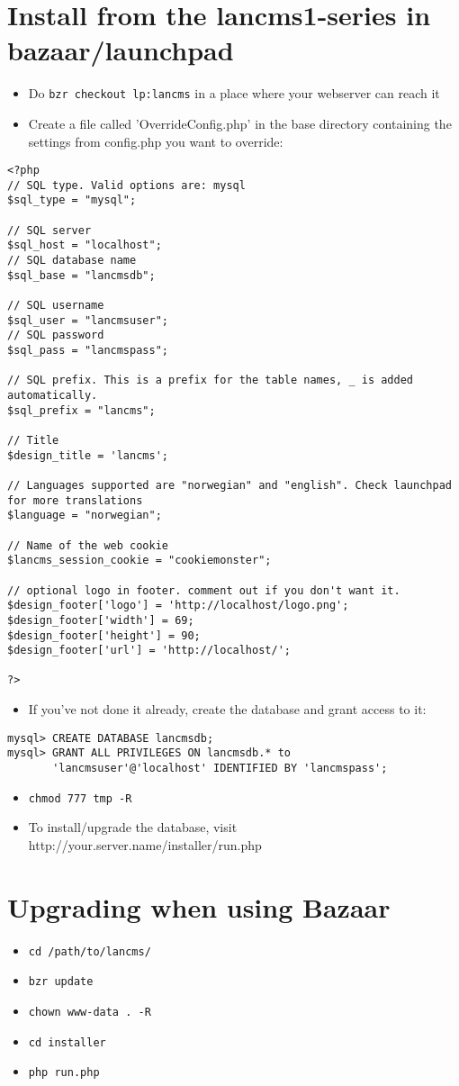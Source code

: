 \section{Install from the lancms1-series in bazaar/launchpad}
\begin{itemize}
\item Do \lstinline!bzr checkout lp:lancms! in a place where your webserver can reach it
\item Create a file called 'OverrideConfig.php' in the base directory containing the settings from config.php you want to override:
\end{itemize}
\begin{lstlisting}
<?php
// SQL type. Valid options are: mysql
$sql_type = "mysql";

// SQL server
$sql_host = "localhost";
// SQL database name
$sql_base = "lancmsdb";

// SQL username
$sql_user = "lancmsuser";
// SQL password
$sql_pass = "lancmspass";

// SQL prefix. This is a prefix for the table names, _ is added automatically.
$sql_prefix = "lancms";

// Title
$design_title = 'lancms';

// Languages supported are "norwegian" and "english". Check launchpad for more translations
$language = "norwegian";

// Name of the web cookie
$lancms_session_cookie = "cookiemonster";

// optional logo in footer. comment out if you don't want it.
$design_footer['logo'] = 'http://localhost/logo.png';
$design_footer['width'] = 69;
$design_footer['height'] = 90;
$design_footer['url'] = 'http://localhost/';

?>
\end{lstlisting}
\begin{itemize}
\item If you've not done it already, create the database and grant access to
it:
\end{itemize}
\begin{lstlisting}
mysql> CREATE DATABASE lancmsdb;
mysql> GRANT ALL PRIVILEGES ON lancmsdb.* to
       'lancmsuser'@'localhost' IDENTIFIED BY 'lancmspass';
\end{lstlisting}
\begin{itemize}
\item \lstinline!chmod 777 tmp -R!
\item To install/upgrade the database, visit
http://your.server.name/installer/run.php
\end{itemize}

\section{Upgrading when using Bazaar}
\begin{itemize}
\item \lstinline!cd /path/to/lancms/!
\item \lstinline!bzr update!
\item \lstinline!chown www-data . -R!
\item \lstinline!cd installer!
\item \lstinline!php run.php!
\end{itemize}
